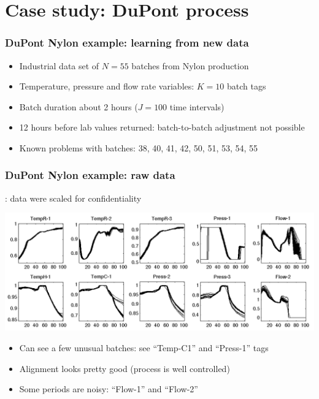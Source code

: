 
\section{Case study: DuPont process}

\begin{frame}\frametitle{DuPont Nylon example: learning from new data}

	\begin{itemize}
		\item	Industrial data set of \( N = 55 \) batches from Nylon production
		
		\item	Temperature, pressure and flow rate variables: \( K = 10\)  batch tags
		
		\item	Batch duration about 2 hours (\( J=100 \) time intervals)
		
		\item	12 hours before lab values returned: batch-to-batch adjustment not possible
		
		\item	Known problems with batches: 38, 40, 41, 42, 50, 51, 53, 54, 55
	\end{itemize}
	
	
\end{frame}

\begin{frame}\frametitle{DuPont Nylon example: raw data}
	{\color{myGreen}{Note}}: data were scaled for confidentiality
	\begin{center}
		\includegraphics[width=\textwidth]{images/dupont/dupont-raw-data-trajectories.png}
	\end{center}
	
	\vspace{1cm}
	\begin{itemize}
		\item	Can see a few unusual batches: see ``Temp-C1'' and ``Press-1'' tags
		
		\item	Alignment looks pretty good (process is well controlled)
		
		\item	Some periods are noisy: ``Flow-1'' and ``Flow-2''
	\end{itemize}
\end{frame}

